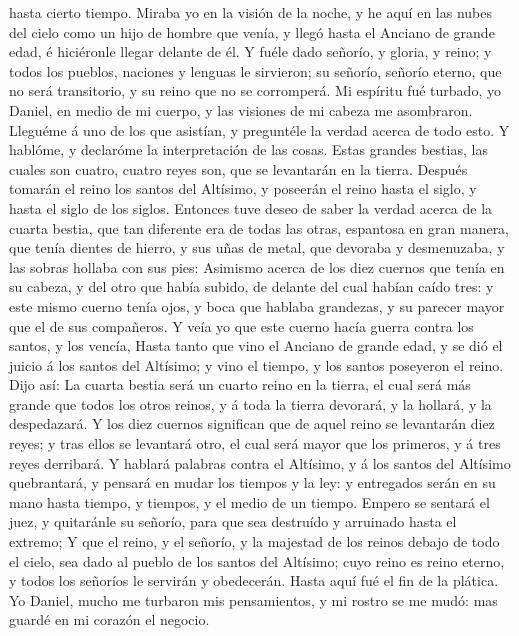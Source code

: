 hasta cierto tiempo.  Miraba yo en la visión de la noche,
y he aquí en las nubes del cielo como un hijo de hombre que venía, y
llegó hasta el Anciano de grande edad, é hiciéronle llegar delante de
él.  Y fuéle dado señorío, y gloria, y reino; y todos los
pueblos, naciones y lenguas le sirvieron; su señorío, señorío eterno,
que no será transitorio, y su reino que no se corromperá.
 Mi espíritu fué turbado, yo Daniel, en medio de mi
cuerpo, y las visiones de mi cabeza me asombraron. 
Lleguéme á uno de los que asistían, y preguntéle la verdad acerca de
todo esto. Y hablóme, y declaróme la interpretación de las cosas.
 Estas grandes bestias, las cuales son cuatro, cuatro
reyes son, que se levantarán en la tierra.  Después
tomarán el reino los santos del Altísimo, y poseerán el reino hasta el
siglo, y hasta el siglo de los siglos.  Entonces tuve
deseo de saber la verdad acerca de la cuarta bestia, que tan diferente
era de todas las otras, espantosa en gran manera, que tenía dientes de
hierro, y sus uñas de metal, que devoraba y desmenuzaba, y las sobras
hollaba con sus pies:  Asimismo acerca de los diez
cuernos que tenía en su cabeza, y del otro que había subido, de delante
del cual habían caído tres: y este mismo cuerno tenía ojos, y boca que
hablaba grandezas, y su parecer mayor que el de sus compañeros.
 Y veía yo que este cuerno hacía guerra contra los
santos, y los vencía,  Hasta tanto que vino el Anciano de
grande edad, y se dió el juicio á los santos del Altísimo; y vino el
tiempo, y los santos poseyeron el reino.  Dijo así: La
cuarta bestia será un cuarto reino en la tierra, el cual será más grande
que todos los otros reinos, y á toda la tierra devorará, y la hollará, y
la despedazará.  Y los diez cuernos significan que de
aquel reino se levantarán diez reyes; y tras ellos se levantará otro, el
cual será mayor que los primeros, y á tres reyes derribará.
 Y hablará palabras contra el Altísimo, y á los santos
del Altísimo quebrantará, y pensará en mudar los tiempos y la ley: y
entregados serán en su mano hasta tiempo, y tiempos, y el medio de un
tiempo.  Empero se sentará el juez, y quitaránle su
señorío, para que sea destruído y arruinado hasta el extremo;
 Y que el reino, y el señorío, y la majestad de los
reinos debajo de todo el cielo, sea dado al pueblo de los santos del
Altísimo; cuyo reino es reino eterno, y todos los señoríos le servirán y
obedecerán.  Hasta aquí fué el fin de la plática. Yo
Daniel, mucho me turbaron mis pensamientos, y mi rostro se me mudó: mas
guardé en mi corazón el negocio.

